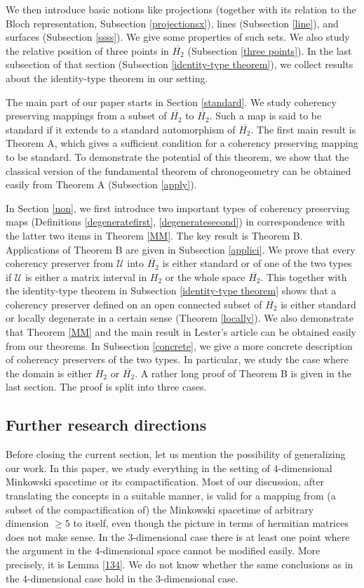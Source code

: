 \documentclass[10pt]{amsart}
\theoremstyle{definition}
\theoremstyle{remark}
\numberwithin{subsection}{section}
\numberwithin{equation}{section}
\newcommand\oH{{\overline{H_2}}}
\begin{document}
We then introduce basic notions like projections (together with its relation to the Bloch representation, Subsection \ref{projectionsx}), lines (Subsection \ref{line}), and surfaces (Subsection \ref{ssss}). We give some properties of such sets. We also study the relative position of three points in $\oH$ (Subsection \ref{three points}).
In the last subsection of that section (Subsection \ref{identity-type theorem}), we collect results about the identity-type theorem in our setting.

The main part of our paper starts in Section \ref{standard}.
We study coherency preserving mappings from a subset of $\oH$ to $\oH$. 
Such a map is said to be standard if it extends to a standard automorphism of $\oH$.
The first main result is Theorem A, which gives a sufficient condition for a coherency preserving mapping to be standard. 
To demonstrate the potential of this theorem, we show that the classical version of the fundamental theorem of chronogeometry can be obtained easily from Theorem A (Subsection \ref{apply}).

In Section \ref{non}, we first introduce two important types of coherency preserving maps (Definitions \ref{degeneratefirst}, \ref{degeneratesecond}) in correspondence with the latter two items in Theorem \ref{MM}. 
The key result is Theorem B.
Applications of Theorem B are given in Subsection \ref{applici}.
We prove that every coherency preserver from $\mathcal{U}$ into $\oH$ is either standard or of one of the two types if $\mathcal{U}$ is either a matrix interval in $H_2$ or the whole space $\oH$. 
This together with the identity-type theorem in Subsection \ref{identity-type theorem} shows that a coherency preserver defined on an open connected subset of $\oH$ is either standard or locally degenerate in a certain sense (Theorem \ref{locally}).
We also demonstrate that Theorem \ref{MM} and the main result in Lester's article \cite{Les} can be obtained easily from our theorems.
In Subsection \ref{concrete}, we give a more concrete description of coherency preservers of the two types. In particular, we study the case where the domain is either $H_2$ or $\oH$.
A rather long proof of Theorem B is given in the last section. 
The proof is split into three cases.

\subsection{Further research directions} 
Before closing the current section, let us mention the possibility of generalizing our work. 
In this paper, we study everything in the setting of $4$-dimensional Minkowski spacetime or its compactification. 
Most of our discussion, after translating the concepts in a suitable manner, is valid for a mapping from (a subset of the compactification of) the Minkowski spacetime of arbitrary dimension $\geq 5$ to itself, even though the picture in terms of hermitian matrices does not make sense.
In the $3$-dimensional case there is at least one point where the argument in the 4-dimensional space cannot be modified easily. 
More precisely, it is Lemma \ref{134}.
We do not know whether the same conclusions as in the 4-dimensional case hold in the 3-dimensional case.
\end{document}
